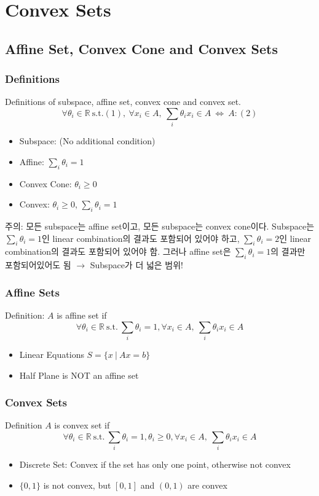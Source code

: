 \section{Convex Sets}

\subsection{Affine Set, Convex Cone and Convex Sets}

\subsubsection*{Definitions}
Definitions of subspace, affine set, convex cone and convex set.
$$
    \forall \theta_i \in \mathbb{R}~\mathrm{s.t. (1)},~
    \forall x_i \in A,~\sum_i \theta_i x_i \in A~\Leftrightarrow~A: \mathrm{(2)}
$$
\begin{itemize}
    \item Subspace: (No additional condition)
    \item Affine: $\sum_i \theta_i = 1$
    \item Convex Cone: $\theta_i \geq 0$
    \item Convex: $\theta_i \geq 0$, $\sum_i \theta_i = 1$
\end{itemize}

주의: 모든 subspace는 affine set이고, 모든 subspace는 convex cone이다. Subspace는 $\sum_i \theta_i = 1$인
linear combination의 결과도 포함되어 있어야 하고, $\sum_i \theta_i = 2$인 linear combination의 결과도 포함되어 있어야 함.
그러나 affine set은 $\sum_i \theta_i = 1$의 결과만 포함되어있어도 됨 $\rightarrow$ Subspace가 더 넓은 범위!

\subsubsection*{Affine Sets}
Definition: $A$ is affine set if
$$
    \forall \theta_i \in \mathbb{R}~\mathrm{s.t.}~\sum_i \theta_i = 1, \forall x_i \in A,~\sum_i \theta_i x_i \in A
$$
\begin{itemize}
    \item Linear Equations $S = \{x~|~Ax=b\}$
    \item Half Plane is NOT an affine set
\end{itemize}

\subsubsection*{Convex Sets}
Definition $A$ is convex set if
$$
    \forall \theta_i \in \mathbb{R}~\mathrm{s.t.}~\sum_i \theta_i = 1, \theta_i \geq 0, \forall x_i \in A,~\sum_i \theta_i x_i \in A
$$
\begin{itemize}
    \item Discrete Set: Convex if the set has only one point, otherwise not convex
    \item $\{0,1\}$ is not convex, but $[0,1]$ and $(0,1)$ are convex
\end{itemize}

